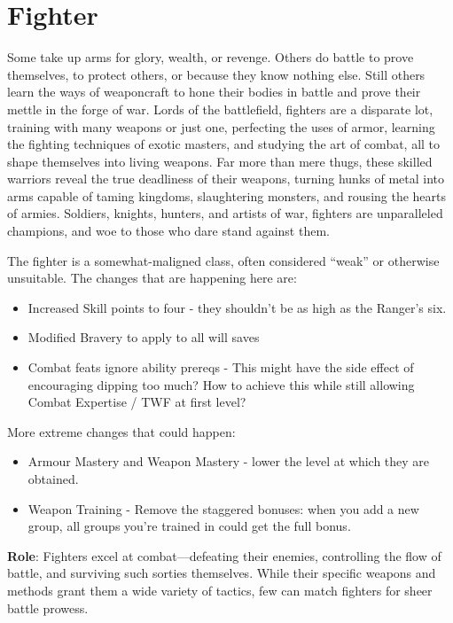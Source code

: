 \section{Fighter}

\label{f0}				
Some take up arms for glory, wealth, or revenge. Others do battle to prove themselves, to protect others, or because they know nothing else. Still others learn the ways of weaponcraft to hone their bodies in battle and prove their mettle in the forge of war. Lords of the battlefield, fighters are a disparate lot, training with many weapons or just one, perfecting the uses of armor, learning the fighting techniques of exotic masters, and studying the art of combat, all to shape themselves into living weapons. Far more than mere thugs, these skilled warriors reveal the true deadliness of their weapons, turning hunks of metal into arms capable of taming kingdoms, slaughtering monsters, and rousing the hearts of armies. Soldiers, knights, hunters, and artists of war, fighters are unparalleled champions, and woe to those who dare stand against them.
				
\begin{formal}
The fighter is a somewhat-maligned class, often considered ``weak'' or otherwise unsuitable.
The changes that are happening here are:
\begin{itemize}
 \item Increased Skill points to four - they shouldn't be as high as the Ranger's six.
 \item Modified Bravery to apply to all will saves
 \item Combat feats ignore ability prereqs - This might have the side effect of 
     encouraging dipping too much? How to achieve this while still allowing
     Combat Expertise / TWF at first level?
\end{itemize}
More extreme changes that could happen:
\begin{itemize}
 \item Armour Mastery and Weapon Mastery - lower the level at which they are obtained.
 \item Weapon Training - Remove the staggered bonuses: when you add a new group, all
    groups you're trained in could get the full bonus.
\end{itemize}

\end{formal}
\textbf{Role}: Fighters excel at combat---defeating their enemies, controlling the flow of battle, and surviving such sorties themselves. While their specific weapons and methods grant them a wide variety of tactics, few can match fighters for sheer battle prowess.
				
